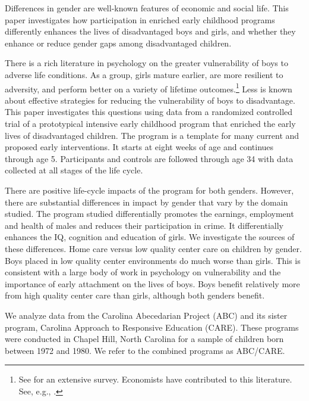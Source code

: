 Differences in gender are well-known features of economic and social life. This paper investigates how participation in enriched early childhood programs differently enhances the lives of disadvantaged boys and girls, and whether they enhance or reduce gender gaps among disadvantaged children.

There is a rich literature in psychology on the greater vulnerability of boys to adverse life conditions. As a group, girls mature earlier, are more resilient to adversity, and perform better on a variety of lifetime outcomes.\footnote{See \cite{Schore_2017_IMHJ} for an extensive survey. Economists have contributed to this literature. See, e.g., \cite{Autor-etal_2015_Family-Disadvantage}.} Less is known about effective strategies for reducing the vulnerability of boys to disadvantage. This paper investigates this questions using data from a randomized controlled trial of a prototypical intensive early childhood program that enriched the early lives of disadvantaged children. The program is a template for many current and proposed early interventions. It starts at eight weeks of age and continues through age 5. Participants and controls are followed through age 34 with data collected at all stages of the life cycle.

There are positive life-cycle impacts of the program for both genders. However, there are substantial differences in impact by gender that vary by the domain studied. The program studied differentially promotes the earnings, employment and health of males and reduces their participation in crime. It differentially enhances the IQ, cognition and education of girls. We investigate the sources of these differences. Home care versus low quality center care on children by gender. Boys placed in low quality center environments do much worse than girls. This is consistent with a large body of work in psychology on vulnerability and the importance of early attachment on the lives of boys. Boys benefit relatively more from high quality center care than girls, although both genders benefit.

We analyze data from the Carolina Abecedarian Project (ABC) and its sister program, Carolina Approach to Responsive Education (CARE). These programs were conducted in Chapel Hill, North Carolina for a sample of children born between 1972 and 1980. We refer to the combined programs as ABC/CARE.

